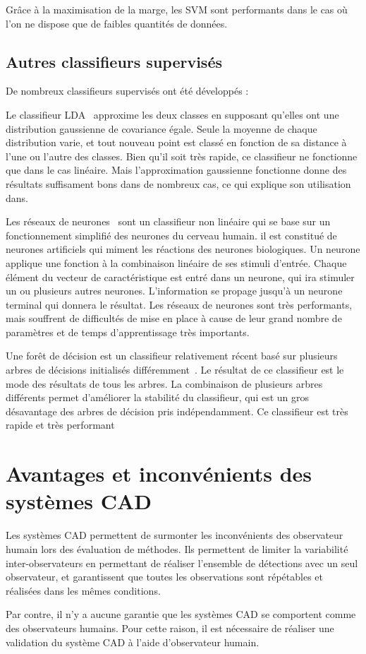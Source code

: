 Grâce à la maximisation de la marge, les SVM sont performants dans le cas où l'on ne dispose que de faibles quantités de données. 

\subsection{Autres classifieurs supervisés}

De nombreux classifieurs supervisés ont été développés :

\label{lab:LDA}
Le classifieur LDA~\cite{fisher1936use} approxime les deux classes en supposant qu'elles ont une distribution gaussienne de covariance égale. Seule la moyenne de chaque distribution varie, et tout nouveau point est classé en fonction de sa distance à l'une ou l'autre des classes. Bien qu'il soit très rapide, ce classifieur ne fonctionne que dans le cas linéaire. Mais l'approximation gaussienne fonctionne donne des résultats suffisament bons dans de nombreux cas, ce qui explique son utilisation dans.

Les réseaux de neurones~\cite{haykin1999neural} sont un classifieur non linéaire qui se base sur un fonctionnement simplifié des neurones du cerveau humain. il est constitué de neurones artificiels qui miment les réactions des neurones biologiques. Un neurone applique une fonction à la combinaison linéaire de ses stimuli d'entrée. Chaque élément du vecteur de caractéristique est entré dans un neurone, qui ira stimuler un ou plusieurs autres neurones. L'information se propage jusqu'à un neurone terminal qui donnera le résultat. Les réseaux de neurones sont très performants, mais souffrent de difficultés de mise en place à cause de leur grand nombre de paramètres et de temps d'apprentissage très importants.

Une forêt de décision est un classifieur relativement récent basé sur plusieurs arbres de décisions initialisés différemment~\cite{ho1998random}. Le résultat de ce classifieur est le mode des résultats de tous les arbres. La combinaison de plusieurs arbres différents permet d'améliorer la stabilité du classifieur, qui est un gros désavantage des arbres de décision pris indépendamment. Ce classifieur est très rapide et très performant

\section{Avantages et inconvénients des systèmes CAD}

Les systèmes CAD permettent de surmonter les inconvénients des observateur humain lors des évaluation de méthodes. Ils permettent de limiter la variabilité inter-observateurs en permettant de réaliser l'ensemble de détections avec un seul observateur, et garantissent que toutes les observations sont répétables et réalisées dans les mêmes conditions.

Par contre, il n'y a aucune garantie que les systèmes CAD se comportent comme des observateurs humains. Pour cette raison, il est nécessaire de réaliser une validation du système CAD à l'aide d'observateur humain.

